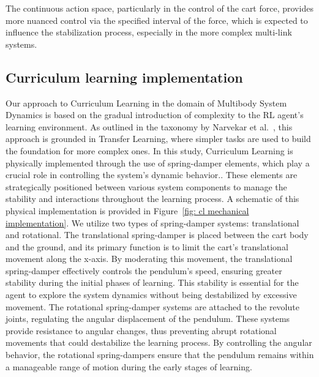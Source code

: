 The continuous action space, particularly in the control of the cart force, provides more nuanced control via the specified interval of the force, which is expected to influence the stabilization process, especially in the more complex multi-link systems.

\subsection{Curriculum learning implementation} \label{subsec: Curriculum learning implementation}
Our approach to Curriculum Learning in the domain of Multibody System Dynamics is based on the gradual introduction of complexity to the RL agent’s learning environment. As outlined in the taxonomy by Narvekar et al.~\cite{narvekar2020survey}, this approach is grounded in Transfer Learning, where simpler tasks are used to build the foundation for more complex ones.
In this study, Curriculum Learning is physically implemented through the use of spring-damper elements, which play a crucial role in controlling the system's dynamic behavior.. These elements are strategically positioned between various system components to manage the stability and interactions throughout the learning process. A schematic of this physical implementation is provided in Figure~\ref{fig: cl mechanical implementation}. We utilize two types of spring-damper systems: translational and rotational.
The translational spring-damper is placed between the cart body and the ground, and its primary function is to limit the cart’s translational movement along the x-axis. By moderating this movement, the translational spring-damper effectively controls the pendulum’s speed, ensuring greater stability during the initial phases of learning. This stability is essential for the agent to explore the system dynamics without being destabilized by excessive movement. The rotational spring-damper systems are attached to the revolute joints, regulating the angular displacement of the pendulum. These systems provide resistance to angular changes, thus preventing abrupt rotational movements that could destabilize the learning process. By controlling the angular behavior, the rotational spring-dampers ensure that the pendulum remains within a manageable range of motion during the early stages of learning.

